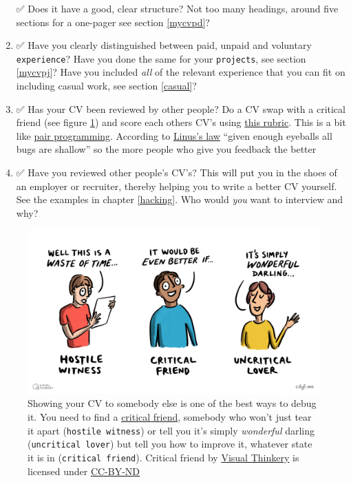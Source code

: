 \documentclass[
]{book}
\begin{document}
\begin{enumerate}
  ✅ Does it have a good, clear structure? Not too many headings, around five sections for a one-pager see section \ref{mycvpd}?
\item
  ✅ Have you clearly distinguished between paid, unpaid and voluntary \texttt{experience}? Have you done the same for your \texttt{projects}, see section \ref{mycvpj}? Have you included \emph{all} of the relevant experience that you can fit on including casual work, see section \ref{casual}?
\item
  ✅ Has your CV been reviewed by other people? Do a CV swap with a critical friend (see figure \ref{fig:wonderfuldarling-fig}) and score each others CV's using \href{https://www.cdyf.me/CV-rubric.pdf}{this rubric}. This is a bit like \href{https://en.wikipedia.org/wiki/Pair_programming}{pair programming}. According to \href{https://en.wikipedia.org/wiki/Linus\%27s_law}{Linus's law} ``given enough eyeballs all bugs are shallow'' \citep{Raymond1999} so the more people who give you feedback the better
\item
  ✅ Have you reviewed other people's CV's? This will put you in the shoes of an employer or recruiter, thereby helping you to write a better CV yourself. See the examples in chapter \ref{hacking}. Who would \emph{you} want to interview and why?
\end{enumerate}

\begin{figure}

{\centering \includegraphics[width=1\linewidth]{images/Critical Friend} 

}

\caption{Showing your CV to somebody else is one of the best ways to debug it. You need to find a \href{https://en.wikipedia.org/wiki/Critical_friend}{critical friend}, somebody who won't just tear it apart (\texttt{hostile\ witness}) or tell you it's simply \emph{wonderful} darling (\texttt{uncritical\ lover}) but tell you how to improve it, whatever state it is in (\texttt{critical\ friend}). Critical friend by \href{https://visualthinkery.com/}{Visual Thinkery} is licensed under \href{https://creativecommons.org/licenses/by-nd/4.0/}{CC-BY-ND}}\label{fig:wonderfuldarling-fig}
\end{figure}
\end{document}
